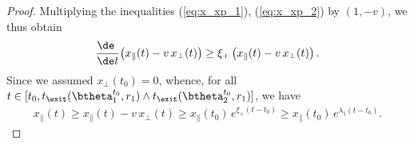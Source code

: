 \documentclass[11pt]{article}
\begin{document}
\begin{proof}
Multiplying the inequalities (\ref{eq:x_xp_1}), (\ref{eq:x_xp_2}) by $(1,-v)$, we thus obtain
%
\begin{align}
%
\frac{\de\phantom{t}}{\de t} \big(x_{\parallel}(t)-v\, x_{\perp}(t)\big)\ge \xi_+ \, \big(x_{\parallel}(t)-v\, x_{\perp}(t)\big)\, .
%
\end{align}
%
Since we assumed $x_{\perp}(t_0) = 0$, whence, for all $t  \in [t_0, t_{\exit}(\btheta^{t_0}_1,r_1)\wedge t_{\exit}(\btheta^{t_0}_2,r_1)]$, we have
\begin{align}
x_{\parallel}(t) \ge x_{\parallel}(t)-v\, x_{\perp}(t) \ge x_{\parallel}(t_0)\, e^{\xi_+(t-t_0)} \ge x_{\parallel}(t_0)\, e^{\lambda_1 (t-t_0)}.
\end{align}

\end{proof}
\end{document}
